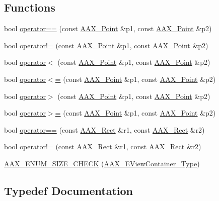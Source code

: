 \subsection*{Functions}
\begin{DoxyCompactItemize}
\item 
bool \hyperlink{a00214_a899f910710cb6ccc0a7558221b6662a2}{operator==} (const \hyperlink{a00119}{A\+A\+X\+\_\+\+Point} \&p1, const \hyperlink{a00119}{A\+A\+X\+\_\+\+Point} \&p2)
\item 
bool \hyperlink{a00214_a0eb2e452ed0865872e0f0862dee6ca29}{operator!=} (const \hyperlink{a00119}{A\+A\+X\+\_\+\+Point} \&p1, const \hyperlink{a00119}{A\+A\+X\+\_\+\+Point} \&p2)
\item 
bool \hyperlink{a00214_acf1fd6c19f55dafdee37e5ba34b24833}{operator$<$} (const \hyperlink{a00119}{A\+A\+X\+\_\+\+Point} \&p1, const \hyperlink{a00119}{A\+A\+X\+\_\+\+Point} \&p2)
\item 
bool \hyperlink{a00214_a3e748786f6aec65c75791b067f5158d3}{operator$<$=} (const \hyperlink{a00119}{A\+A\+X\+\_\+\+Point} \&p1, const \hyperlink{a00119}{A\+A\+X\+\_\+\+Point} \&p2)
\item 
bool \hyperlink{a00214_adc56c3178fe78676f64e658930a66afb}{operator$>$} (const \hyperlink{a00119}{A\+A\+X\+\_\+\+Point} \&p1, const \hyperlink{a00119}{A\+A\+X\+\_\+\+Point} \&p2)
\item 
bool \hyperlink{a00214_aab8ccb30f5a16c24a5364804fb28478c}{operator$>$=} (const \hyperlink{a00119}{A\+A\+X\+\_\+\+Point} \&p1, const \hyperlink{a00119}{A\+A\+X\+\_\+\+Point} \&p2)
\item 
bool \hyperlink{a00214_a94c3ae4ba9ec60e0ccb85c6b565908db}{operator==} (const \hyperlink{a00120}{A\+A\+X\+\_\+\+Rect} \&r1, const \hyperlink{a00120}{A\+A\+X\+\_\+\+Rect} \&r2)
\item 
bool \hyperlink{a00214_af834f4e14c1f9e811efa1921a520fdcb}{operator!=} (const \hyperlink{a00120}{A\+A\+X\+\_\+\+Rect} \&r1, const \hyperlink{a00120}{A\+A\+X\+\_\+\+Rect} \&r2)
\item 
\hyperlink{a00214_a58a6a1f6c9c669ba3cbd788d290f1109}{A\+A\+X\+\_\+\+E\+N\+U\+M\+\_\+\+S\+I\+Z\+E\+\_\+\+C\+H\+E\+C\+K} (\hyperlink{a00214_a89d5cb8c7fdb11f34e695fb0e057b764}{A\+A\+X\+\_\+\+E\+View\+Container\+\_\+\+Type})
\end{DoxyCompactItemize}


\subsection{Typedef Documentation}
\hypertarget{a00214_aace06b5ca898ac66c68fe5f5c598f0b6}{}
